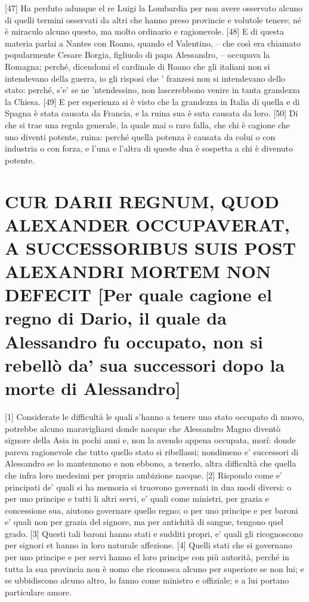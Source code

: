 {[}47{]} Ha perduto adunque el re Luigi la Lombardia per non avere
osservato alcuno di quelli termini osservati da altri che hanno preso
provincie e volutole tenere; né è miraculo alcuno questo, ma molto
ordinario e ragionevole. {[}48{]} E di questa materia parlai a Nantes
con Roano, quando el Valentino, -- che così era chiamato popularmente
Cesare Borgia, figliuolo di papa Alessandro, -- occupava la Romagna;
perché, dicendomi el cardinale di Roano che gli italiani non si
intendevano della guerra, io gli risposi che ' franzesi non si
intendevano dello stato: perché, s'e' se ne 'ntendessino, non
lascerebbono venire in tanta grandezza la Chiesa. {[}49{]} E per
esperienza si è visto che la grandezza in Italia di quella e di Spagna è
stata causata da Francia, e la ruina sua è suta causata da loro.
{[}50{]} Di che si trae una regula generale, la quale mai o raro falla,
che chi è cagione che uno diventi potente, ruina: perché quella potenza
è causata da colui o con industria o con forza, e l'una e l'altra di
queste dua è sospetta a chi è divenuto potente.

\quebra\section{CUR DARII REGNUM, QUOD ALEXANDER OCCUPAVERAT, A SUCCESSORIBUS SUIS POST
ALEXANDRI MORTEM NON DEFECIT
{[}Per quale cagione el regno di Dario, il quale da Alessandro fu
occupato, non si rebellò da' sua successori dopo la morte di
Alessandro{]}}

{[}1{]} Considerate le difficultà le quali s'hanno a tenere uno stato
occupato di nuovo, potrebbe alcuno maravigliarsi donde nacque che
Alessandro Magno diventò signore della Asia in pochi anni e, non la
avendo appena occupata, morí: donde pareva ragionevole che tutto quello
stato si ribellassi; nondimeno e' successori di Alessandro se lo
mantennono e non ebbono, a tenerlo, altra difficultà che quella che
infra loro medesimi per propria ambizione nacque. {[}2{]} Rispondo come
e' principati de' quali si ha memoria si truovono governati in dua modi
diversi: o per uno principe e tutti li altri servi, e' quali come
ministri, per grazia e concessione sua, aiutono governare quello regno;
o per uno principe e per baroni e' quali non per grazia del signore, ma
per antichità di sangue, tengono quel grado. {[}3{]} Questi tali baroni
hanno stati e sudditi propri, e' quali gli ricognoscono per signori et
hanno in loro naturale affezione. {[}4{]} Quelli stati che si governano
per uno principe e per servi hanno el loro principe con più autorità,
perché in tutta la sua provincia non è uomo che riconosca alcuno per
superiore se non lui; e se ubbidiscono alcuno altro, lo fanno come
ministro e offiziale; e a lui portano particulare amore.

